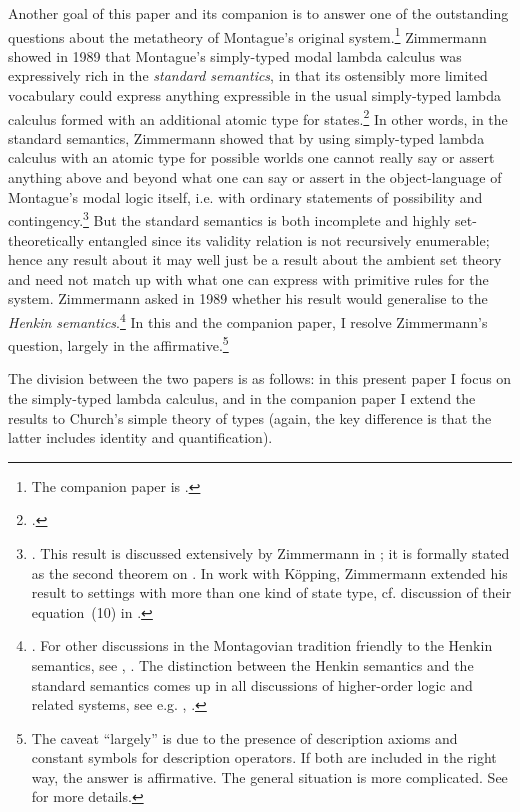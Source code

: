 \documentclass{lmcs} %
\begin{document}
Another goal of this paper and its companion is to answer one of the outstanding questions about the metatheory of Montague's original system.\footnote{The companion paper is \cite{Walsh2024-mltII}.} Zimmermann showed in 1989 that Montague's simply-typed modal lambda calculus was expressively rich in the \emph{standard semantics}, in that its ostensibly more limited vocabulary could express anything expressible in the usual simply-typed lambda calculus formed with an additional atomic type for states.\footnote{\cite{Zimmermann1989-gs}.} In other words, in the standard semantics, Zimmermann showed that by using simply-typed lambda calculus with an atomic type for possible worlds one cannot really say or assert anything above and beyond what one can say or assert in the object-language of Montague's modal logic itself, i.e. with ordinary statements of possibility and contingency.\footnote{\cite[p. 75]{Zimmermann1989-gs}. This result is discussed extensively by Zimmermann in \cite{Zimmermann2020-an}; it is formally stated as the second theorem on \cite[p. 31]{Zimmermann2020-an}. In work with K\"opping, Zimmermann extended his result to settings with more than one kind of state type, cf. discussion of their equation~(10) in \cite[pp. 171, 175-176]{Kopping2020-xz}.} But the standard semantics is both incomplete and highly set-theoretically entangled since its validity relation is not recursively enumerable; hence any result about it may well just be a result about the ambient set theory and need not match up with what one can express with primitive rules for the system. Zimmermann asked in 1989 whether his result would generalise to the \emph{Henkin semantics}.\footnote{\cite[\S{4.2} pp. 75-76]{Zimmermann1989-gs}. For other discussions in the Montagovian tradition friendly to the Henkin semantics, see \cite[\S{3.1.1} p. 316]{Partee1977-vr}, \cite[p. 98]{Janssen1983-rm}. The distinction between the Henkin semantics and the standard semantics comes up in all discussions of higher-order logic and related systems, see e.g. \cite{Shapiro1991-oe}, \cite{Button2018-ux}.} In this and the companion paper, I resolve Zimmermann's question, largely in the affirmative.\footnote{The caveat ``largely'' is due to the presence of description axioms and constant symbols for description operators. If both are included in the right way, the answer is affirmative. The general situation is more complicated. See \cite{Walsh2024-mltII} for more details.} 

The division between the two papers is as follows: in this present paper I focus on the simply-typed lambda calculus, and in the companion paper I extend the results to Church's simple theory of types (again, the key difference is that the latter includes identity and quantification).
\end{document}
